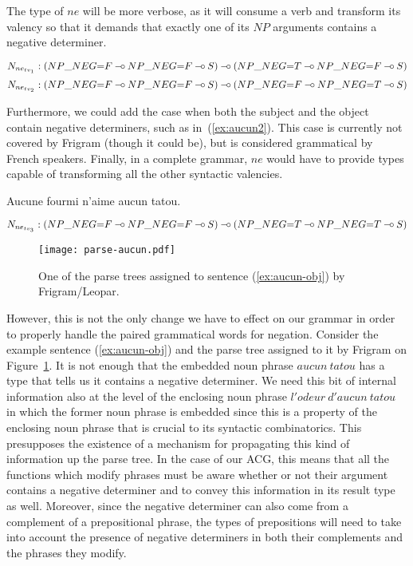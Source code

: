 The type of $ne$ will be more verbose, as it will consume a verb and
transform its valency so that it demands that exactly one of its $NP$
arguments contains a negative determiner.

$$
N_{ne_{tv_1}} : (NP\_NEG{=}F \mathbin{{-}\mkern-3.5mu{\circ}} NP\_NEG{=}F \mathbin{{-}\mkern-3.5mu{\circ}} S) \mathbin{{-}\mkern-3.5mu{\circ}} (NP\_NEG{=}T \mathbin{{-}\mkern-3.5mu{\circ}} NP\_NEG{=}F \mathbin{{-}\mkern-3.5mu{\circ}} S)
$$
$$
N_{ne_{tv_2}} : (NP\_NEG{=}F \mathbin{{-}\mkern-3.5mu{\circ}} NP\_NEG{=}F \mathbin{{-}\mkern-3.5mu{\circ}} S) \mathbin{{-}\mkern-3.5mu{\circ}} (NP\_NEG{=}F \mathbin{{-}\mkern-3.5mu{\circ}} NP\_NEG{=}T \mathbin{{-}\mkern-3.5mu{\circ}} S)
$$

Furthermore, we could add the case when both the subject and the object
contain negative determiners, such as in~(\ref{ex:aucun2}). This case is
currently not covered by Frigram (though it could be), but is considered
grammatical by French speakers. Finally, in a complete grammar, $ne$
would have to provide types capable of transforming all the other
syntactic valencies.

\begin{exe}
  \ex \label{ex:aucun2} Aucune fourmi n'aime aucun tatou.
\end{exe}

$$
N_{ne_{tv_3}} : (NP\_NEG{=}F \mathbin{{-}\mkern-3.5mu{\circ}} NP\_NEG{=}F \mathbin{{-}\mkern-3.5mu{\circ}} S) \mathbin{{-}\mkern-3.5mu{\circ}} (NP\_NEG{=}T \mathbin{{-}\mkern-3.5mu{\circ}} NP\_NEG{=}T \mathbin{{-}\mkern-3.5mu{\circ}} S)
$$

\begin{figure}
  \centering
  \texttt{[image: parse-aucun.pdf]}
  \caption{\label{fig:parse-aucun} One of the parse trees assigned to
    sentence (\ref{ex:aucun-obj}) by Frigram/Leopar.}
\end{figure}

However, this is not the only change we have to effect on our grammar in
order to properly handle the paired grammatical words for
negation. Consider the example sentence (\ref{ex:aucun-obj}) and the
parse tree assigned to it by Frigram on Figure~\ref{fig:parse-aucun}. It
is not enough that the embedded noun phrase $aucun\ tatou$ has a type
that tells us it contains a negative determiner. We need this bit of
internal information also at the level of the enclosing noun phrase
$l'odeur\ d'aucun\ tatou$ in which the former noun phrase is embedded
since this is a property of the enclosing noun phrase that is crucial to
its syntactic combinatorics. This presupposes the existence of a
mechanism for propagating this kind of information up the parse tree. In
the case of our ACG, this means that all the functions which modify
phrases must be aware whether or not their argument contains a negative
determiner and to convey this information in its result type as
well. Moreover, since the negative determiner can also come from a
complement of a prepositional phrase, the types of prepositions will
need to take into account the presence of negative determiners in both
their complements and the phrases they modify.

